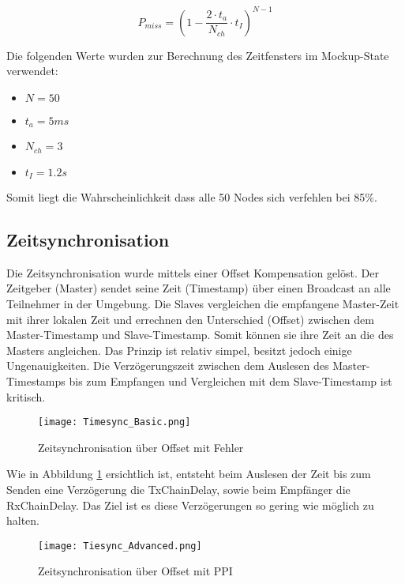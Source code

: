 \begin{equation}\label{eq:BroadcastingMissProbability}
P_{miss} = (1- \frac{2 \cdot t_a}{N_{ch}} \cdot t_I)^{N-1}
\end{equation}

Die folgenden Werte wurden zur Berechnung des Zeitfensters im Mockup-State verwendet:

\begin{itemize}
	\item $N = 50$
	\item $t_a = 5ms$
	\item $N_{ch} = 3$
	\item $t_I = 1.2s$	
\end{itemize} 

Somit liegt die Wahrscheinlichkeit dass alle 50 Nodes sich verfehlen bei 85\%. 

\subsection{Zeitsynchronisation}\label{sec:ZeitsynchronisationP2P}

Die Zeitsynchronisation wurde mittels einer Offset Kompensation gelöst.
Der Zeitgeber (Master) sendet seine Zeit (Timestamp) über einen Broadcast an alle Teilnehmer in der Umgebung.
Die Slaves vergleichen die empfangene Master-Zeit mit ihrer lokalen Zeit und errechnen den Unterschied (Offset) zwischen dem Master-Timestamp und Slave-Timestamp.
Somit können sie ihre Zeit an die des Masters angleichen. Das Prinzip ist relativ simpel, besitzt jedoch einige Ungenauigkeiten. Die Verzögerungszeit zwischen dem Auslesen des Master-Timestamps bis zum Empfangen und Vergleichen mit dem Slave-Timestamp ist kritisch.  

\begin{figure} [H]
	\centering
	\texttt{[image: Timesync\_Basic.png]}
	\caption{Zeitsynchronisation über Offset mit Fehler}
	\label{fig:TimesyncBasicwithErrorP2P}
\end{figure}

Wie in Abbildung \ref{fig:TimesyncBasicwithErrorP2P} ersichtlich ist, entsteht beim Auslesen der Zeit bis zum Senden eine Verzögerung die TxChainDelay, sowie beim Empfänger die RxChainDelay. Das Ziel ist es diese Verzögerungen so gering wie möglich zu halten. 

\begin{figure} [H]
	\centering
	\texttt{[image: Tiesync\_Advanced.png]}
	\caption{Zeitsynchronisation über Offset mit PPI}
	\label{fig:TimesyncwithPPIP2P}
\end{figure}

